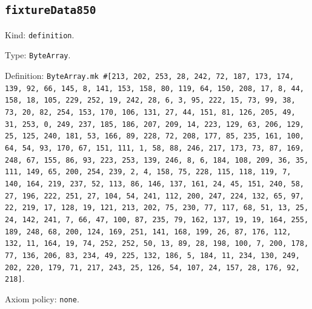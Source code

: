 \documentclass[11pt]{article}
\begin{document}
\subsection*{\texttt{fixtureData850}}
\noindent Kind: \texttt{definition}.\par
\noindent Type: \texttt{ByteArray}.\par
\noindent Definition: \texttt{ByteArray.mk \#[213, 202, 253, 28, 242, 72, 187, 173, 174, 139, 92, 66, 145, 8, 141, 153, 158, 80, 119, 64, 150, 208, 17, 8, 44, 158, 18, 105, 229, 252, 19, 242, 28, 6, 3, 95, 222, 15, 73, 99, 38, 73, 20, 82, 254, 153, 170, 106, 131, 27, 44, 151, 81, 126, 205, 49, 31, 253, 0, 249, 237, 185, 186, 207, 209, 14, 223, 129, 63, 206, 129, 25, 125, 240, 181, 53, 166, 89, 228, 72, 208, 177, 85, 235, 161, 100, 64, 54, 93, 170, 67, 151, 111, 1, 58, 88, 246, 217, 173, 73, 87, 169, 248, 67, 155, 86, 93, 223, 253, 139, 246, 8, 6, 184, 108, 209, 36, 35, 111, 149, 65, 200, 254, 239, 2, 4, 158, 75, 228, 115, 118, 119, 7, 140, 164, 219, 237, 52, 113, 86, 146, 137, 161, 24, 45, 151, 240, 58, 27, 196, 222, 251, 27, 104, 54, 241, 112, 200, 247, 224, 132, 65, 97, 22, 219, 17, 128, 19, 121, 213, 202, 75, 230, 77, 117, 68, 51, 13, 25, 24, 142, 241, 7, 66, 47, 100, 87, 235, 79, 162, 137, 19, 19, 164, 255, 189, 248, 68, 200, 124, 169, 251, 141, 168, 199, 26, 87, 176, 112, 132, 11, 164, 19, 74, 252, 252, 50, 13, 89, 28, 198, 100, 7, 200, 178, 77, 136, 206, 83, 234, 49, 225, 132, 186, 5, 184, 11, 234, 130, 249, 202, 220, 179, 71, 217, 243, 25, 126, 54, 107, 24, 157, 28, 176, 92, 218]}.\par
\noindent Axiom policy: \texttt{none}.\par
\end{document}

